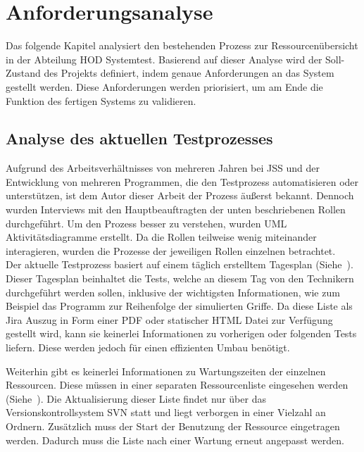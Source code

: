 \section{Anforderungsanalyse}
Das folgende Kapitel analysiert den bestehenden Prozess zur Ressourcenübersicht
in der Abteilung \gls{HOD} Systemtest. Basierend auf dieser Analyse wird der Soll-Zustand 
des Projekts definiert, indem genaue Anforderungen an das System gestellt werden. 
Diese Anforderungen werden priorisiert, um am Ende die Funktion des 
fertigen Systems zu validieren.

\subsection{Analyse des aktuellen Testprozesses}
Aufgrund des Arbeitsverhältnisses von mehreren Jahren bei \gls{JSS} und der Entwicklung
von mehreren Programmen, die den Testprozess automatisieren oder unterstützen, ist
dem Autor dieser Arbeit der Prozess äußerst bekannt. Dennoch wurden Interviews mit den Hauptbeauftragten
der unten beschriebenen Rollen durchgeführt. Um den Prozess besser zu verstehen,
wurden UML Aktivitätsdiagramme erstellt. Da die Rollen teilweise wenig 
miteinander interagieren, wurden die Prozesse der jeweiligen Rollen einzelnen
betrachtet.\\

Der aktuelle Testprozess basiert auf einem täglich erstelltem Tagesplan 
(Siehe~). Dieser Tagesplan beinhaltet die Tests, welche an diesem
Tag von den \gls{Techniker}n durchgeführt werden sollen, inklusive der wichtigsten 
Informationen, wie zum Beispiel das Programm zur Reihenfolge der simulierten Griffe.
Da diese Liste als \gls{Jira} Auszug in Form einer \gls{PDF} oder statischer \gls{HTML} Datei zur Verfügung 
gestellt wird, kann sie keinerlei Informationen zu vorherigen oder folgenden 
Tests liefern. Diese werden jedoch für einen effizienten Umbau benötigt.

Weiterhin gibt es keinerlei Informationen zu Wartungszeiten der einzelnen Ressourcen.
Diese müssen in einer separaten Ressourcenliste eingesehen werden
(Siehe~). Die Aktualisierung dieser Liste findet nur über 
das Versionskontrollsystem \gls{SVN} statt und liegt verborgen in einer Vielzahl
an Ordnern. Zusätzlich muss der Start der Benutzung der Ressource eingetragen
werden. Dadurch muss die Liste nach einer Wartung erneut angepasst werden. \\

\newpage

